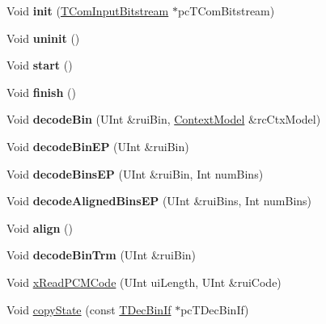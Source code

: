 \begin{DoxyCompactItemize}
\item 
\mbox{\label{class_t_dec_bin_c_a_b_a_c_a8091231556f62812a59314ffb57bd3b9}} 
Void {\bfseries init} (\hyperlink{class_t_com_input_bitstream}{T\+Com\+Input\+Bitstream} $\ast$pc\+T\+Com\+Bitstream)
\item 
\mbox{\label{class_t_dec_bin_c_a_b_a_c_ad318f64c65c826161457a246eaba3740}} 
Void {\bfseries uninit} ()
\item 
\mbox{\label{class_t_dec_bin_c_a_b_a_c_af55693164ef7ca7ba6f43f31232200d4}} 
Void {\bfseries start} ()
\item 
\mbox{\label{class_t_dec_bin_c_a_b_a_c_ae2d03734734c6cdf526c20f5e4b61912}} 
Void {\bfseries finish} ()
\item 
\mbox{\label{class_t_dec_bin_c_a_b_a_c_aab3a01ba5d161819f4a84e92c2c312ac}} 
Void {\bfseries decode\+Bin} (U\+Int \&rui\+Bin, \hyperlink{class_context_model}{Context\+Model} \&rc\+Ctx\+Model)
\item 
\mbox{\label{class_t_dec_bin_c_a_b_a_c_a0d6598099e650a503e2ed68607a1f31d}} 
Void {\bfseries decode\+Bin\+EP} (U\+Int \&rui\+Bin)
\item 
\mbox{\label{class_t_dec_bin_c_a_b_a_c_a351e465ddfff91485348b37e2ba235f4}} 
Void {\bfseries decode\+Bins\+EP} (U\+Int \&rui\+Bin, Int num\+Bins)
\item 
\mbox{\label{class_t_dec_bin_c_a_b_a_c_abae5cc64392098bda78f0f6d7e479a65}} 
Void {\bfseries decode\+Aligned\+Bins\+EP} (U\+Int \&rui\+Bins, Int num\+Bins)
\item 
\mbox{\label{class_t_dec_bin_c_a_b_a_c_a9a041cca306066dcc9f43c7bed1a7220}} 
Void {\bfseries align} ()
\item 
\mbox{\label{class_t_dec_bin_c_a_b_a_c_a951fd87361ad69055fc1036d788ef9a3}} 
Void {\bfseries decode\+Bin\+Trm} (U\+Int \&rui\+Bin)
\item 
Void \hyperlink{class_t_dec_bin_c_a_b_a_c_a530860731da7f12e0c92e379c1d21dc1}{x\+Read\+P\+C\+M\+Code} (U\+Int ui\+Length, U\+Int \&rui\+Code)
\item 
Void \hyperlink{class_t_dec_bin_c_a_b_a_c_a6e127d13b329c85af6998d4e29b8761a}{copy\+State} (const \hyperlink{class_t_dec_bin_if}{T\+Dec\+Bin\+If} $\ast$pc\+T\+Dec\+Bin\+If)
\end{DoxyCompactItemize}




